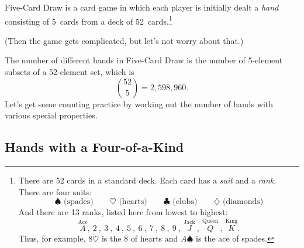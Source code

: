 Five-Card Draw is a card game in which each player is initially dealt
a \emph{hand} consisting of 5~cards from a deck of
52~cards.\footnote{There are 52 cards in a standard deck.  Each card
  has a \emph{suit} and a \emph{rank}.  There are four suits:
%
\[
\spadesuit   \text{ (spades)} \qquad
\heartsuit   \text{ (hearts)} \qquad
\clubsuit    \text{ (clubs)} \qquad
\diamondsuit \text{ (diamonds)}
\]
%
And there are 13 ranks, listed here from lowest to highest:
%
\[
\stackrel{\text{Ace}}{A},\
2\ ,\ 3\ ,\ 4\ ,\ 5\ ,\ 6\ ,\ 7\ ,\ 8\ ,\ 9\ ,\
\stackrel{\text{Jack}}{J}\ ,\
\stackrel{\text{Queen}}{Q}\ ,\
\stackrel{\text{King}}{K}.
\]
%
Thus, for example, $8 \heartsuit$ is the 8 of hearts and $A
\spadesuit$ is the ace of spades.}
\begin{editingnotes}
(Then the game gets complicated, but let's not worry about that.)
\end{editingnotes}
The number of different hands in Five-Card Draw is the number of
5-element subsets of a 52-element set, which is
%
\[
\binom{52}{5} = 2,598,960.
\]
%
Let's get some counting practice by working out the number of hands
with various special properties.

\subsection{Hands with a Four-of-a-Kind}

